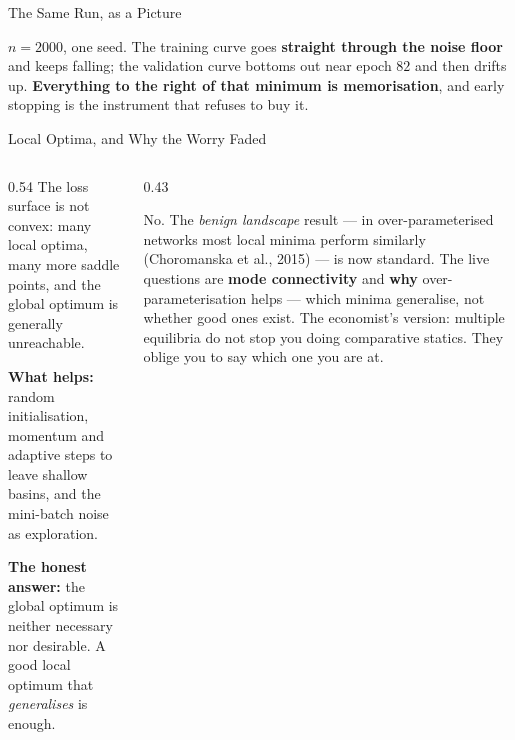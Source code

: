 \begin{frame}{The Same Run, as a Picture}
\begin{center}
\end{center}
\vspace{-1mm}
\begin{takeawaybox}\footnotesize
$n=2000$, one seed. The training curve goes \textbf{straight through the noise floor} and keeps falling; the validation curve bottoms out near epoch $82$ and then drifts up. \textbf{Everything to the right of that minimum is memorisation}, and early stopping is the instrument that refuses to buy it.
\end{takeawaybox}
\vspace{1mm}
\end{frame}

\begin{frame}{Local Optima, and Why the Worry Faded}
\begin{columns}[T]
\begin{column}{0.54\textwidth}
\small
The loss surface is not convex: many local optima, many more saddle points, and the global optimum is generally unreachable.
\medskip

\textbf{What helps:} random initialisation, momentum and adaptive steps to leave shallow basins, and the mini-batch noise as exploration.
\medskip

\textbf{The honest answer:} the global optimum is neither necessary nor desirable. A good local optimum that \emph{generalises} is enough.
\end{column}
\begin{column}{0.43\textwidth}
\begin{conceptbox}[title=\textbf{Is this still the frontier?}]\small
No. The \emph{benign landscape} result --- in over-parameterised networks most local minima perform similarly (Choromanska et al., 2015) --- is now standard.
\medskip
The live questions are \textbf{mode connectivity} and \textbf{why} over-parameterisation helps --- which minima generalise, not whether good ones exist.
\medskip
The economist's version: multiple equilibria do not stop you doing comparative statics. They oblige you to say which one you are at.
\end{conceptbox}
\end{column}
\end{columns}
\vspace{1mm}
\end{frame}

